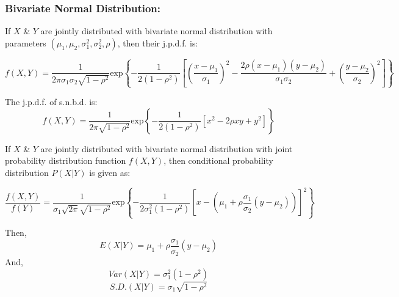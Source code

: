 \documentclass[
10pt, %
a4paper, %
]{report}
\begin{document}
\subsubsection*{Bivariate Normal Distribution:}
If \(X\) \& \(Y\) are jointly distributed with bivariate normal distribution with parameters \((\mu_1, \mu_2, \sigma_1^2, \sigma_2^2, \rho)\), then their j.p.d.f. is:

\[
f(X, Y) = \frac{1}{2\pi\sigma_1\sigma_2\sqrt{1-\rho^2}} \text{exp} \left\{ -\frac{1}{2(1-\rho^2)} \left[ \left( \frac{x-\mu_1}{\sigma_1} \right)^2 - \frac{2\rho(x-\mu_1)(y-\mu_2)}{\sigma_1\sigma_2} + \left( \frac{y-\mu_2}{\sigma_2} \right)^2 \right]\right\}
\]

The j.p.d.f. of s.n.b.d. is:
\[
f(X, Y) = \frac{1}{2\pi\sqrt{1-\rho^2}} \text{exp} \left\{ -\frac{1}{2(1-\rho^2)} \left[ x^2 - 2\rho x y + y^2 \right]\right\}
\]

If \(X\) \& \(Y\) are jointly distributed with bivariate normal distribution with joint probability distribution function \(f(X, Y)\), then conditional probability distribution \(P(X|Y)\) is given as:

\[
\frac{f(X, Y)}{f(Y)} = \frac{1}{\sigma_1 \sqrt{2\pi} \sqrt{1-\rho^2}} \text{exp} \left\{ -\frac{1}{2\sigma_1^2(1-\rho^2)} \left[ x - \left( \mu_1 + \rho \frac{\sigma_1}{\sigma_2} (y-\mu_2) \right) \right]^2 \right\}
\]

Then, 
\[
E(X|Y) = \mu_1 + \rho \frac{\sigma_1}{\sigma_2} (y-\mu_2) 
\]
And,
\[
Var(X|Y) = \sigma_1^2 (1-\rho^2)
\]
\[
S.D.(X|Y) = \sigma_1 \sqrt{1-\rho^2}
\]

\end{document}
